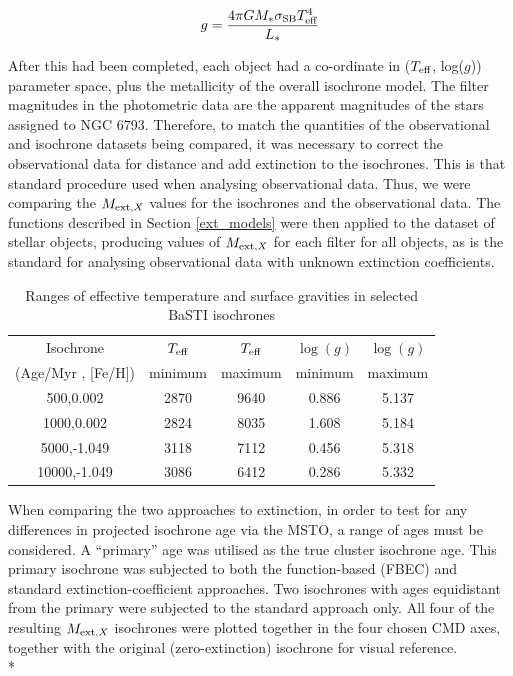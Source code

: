 \documentclass[12pt, a4paper]{report}
\begin{document}
\begin{equation}
\label{gravity_LT_calc}
g = \frac{4 \pi G M_{*} \sigma_{\textnormal{SB}} T_{\textnormal{eff}}^{4}}{L_{*}}
\end{equation}

After this had been completed, each object had a co-ordinate in ($T_{\textnormal{eff}}$, log($g$)) parameter space, plus the metallicity of the overall isochrone model. The filter magnitudes in the photometric data are the apparent magnitudes of the stars assigned to NGC 6793. Therefore, to match the quantities of the observational and isochrone datasets being compared, it was necessary to correct the observational data for distance and add extinction to the isochrones. This is that standard procedure used when analysing observational data. Thus, we were comparing the $M_{\textnormal{ext},X}$ values for the isochrones and the observational data. The functions described in Section \ref{ext_models} were then applied to the dataset of stellar objects, producing values of $M_{\textnormal{ext},X}$ for each filter for all objects, as is the standard for analysing observational data with unknown extinction coefficients.

\begin{table}
\begin{center}
\begin{tabular}{ccccc}
\hline
Isochrone & $T_{\textnormal{eff}}$ & $T_{\textnormal{eff}}$ & $\log(g)$ & $\log(g)$ \\
(Age/Myr , [Fe/H]) & minimum & maximum & minimum & maximum \\
\hline
500,0.002 & 2870 & 9640 & 0.886 & 5.137 \\
1000,0.002 & 2824 & 8035 & 1.608 & 5.184 \\
5000,-1.049 & 3118 & 7112 & 0.456 & 5.318 \\
10000,-1.049 & 3086 & 6412 & 0.286 & 5.332 \\
\hline
\end{tabular}
\caption{Ranges of effective temperature and surface gravities in selected BaSTI isochrones}
\label{variable_ranges}
\end{center}
\end{table}

When comparing the two approaches to extinction, in order to test for any differences in projected isochrone age via the MSTO, a range of ages must be considered. A ``primary'' age was utilised as the true cluster isochrone age. This primary isochrone was subjected to both the function-based (FBEC) and standard extinction-coefficient approaches. Two isochrones with ages equidistant from the primary were subjected to the standard approach only. All four of the resulting $M_{\textnormal{ext},X}$ isochrones were plotted together in the four chosen CMD axes, together with the original (zero-extinction) isochrone for visual reference.\\*
\end{document}

